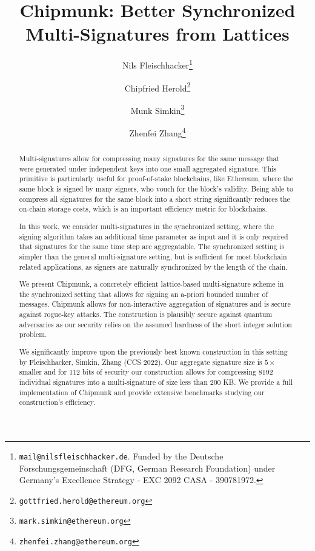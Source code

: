 \documentclass[11pt]{llncs}
\title{Chipmunk: Better Synchronized Multi-Signatures from Lattices}
\author{
 	Nils Fleischhacker\inst{1}\thanks{\texttt{mail@nilsfleischhacker.de}. Funded by the Deutsche Forschungsgemeinschaft (DFG, German Research Foundation) under Germany's Excellence Strategy - EXC 2092 CASA - 390781972.}%
 	\and
 	Chipfried Herold\inst{2}\thanks{\texttt{gottfried.herold@ethereum.org}}%
 	\and
 	Munk Simkin\inst{2}\thanks{\texttt{mark.simkin@ethereum.org}}%
   \and
   Zhenfei Zhang\inst{2}\thanks{\texttt{zhenfei.zhang@ethereum.org}}%
}
\institute{
	 Ruhr University Bochum
	 \and
	 Ethereum Foundation
}
\begin{document}
\pagestyle{plain}

\maketitle
\noindent
\makebox[\linewidth]{\small \today}

\begin{abstract}
Multi-signatures allow for compressing many signatures for the same message that were generated under independent keys into one small aggregated signature. 
This primitive is particularly useful for proof-of-stake blockchains, like Ethereum, where the same block is signed by many signers, who vouch for the block's validity.
Being able to compress all signatures for the same block into a short string significantly reduces the on-chain storage costs, which is an important efficiency metric for blockchains.

In this work, we consider multi-signatures in the synchronized setting, where the signing algorithm takes an additional time parameter as input and it is only required that signatures for the same time step are aggregatable.
The synchronized setting is simpler than the general multi-signature setting, but is sufficient for most blockchain related applications, as signers are naturally synchronized by the length of the chain.

We present Chipmunk, a concretely efficient lattice-based multi-signature scheme in the synchronized setting that allows for signing an a-priori bounded number of messages.
Chipmunk allows for non-interactive aggregation of signatures and is secure against rogue-key attacks.
The construction is plausibly secure against quantum adversaries as our security relies on the assumed hardness of the short integer solution problem.

We significantly improve upon the previously best known construction in this setting by Fleischhacker, Simkin, Zhang (CCS 2022).
Our aggregate signature size is $5 \times$ smaller and for $112$ bits of security our construction allows for compressing 8192 individual signatures into a multi-signature of size less than $200$ KB.
We provide a full implementation of Chipmunk and provide extensive benchmarks studying our construction's efficiency.

\end{abstract}













%
\begin{appendix}
  
\end{appendix}
\end{document}
